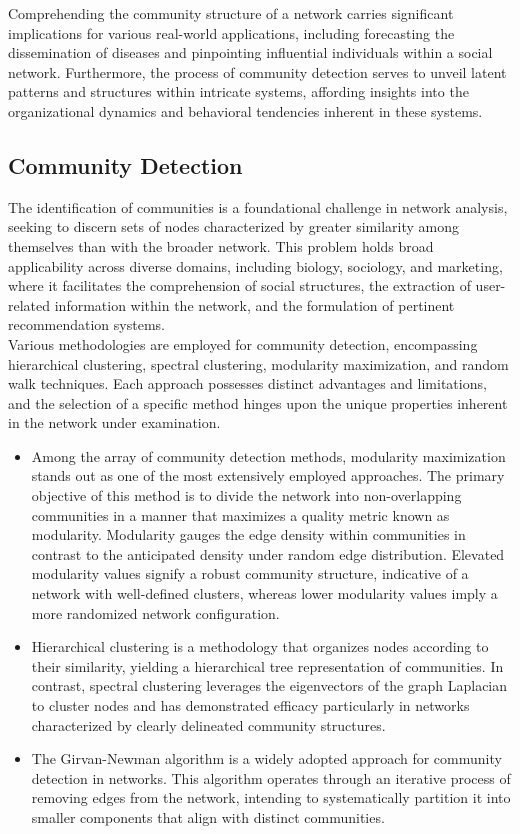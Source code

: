 Comprehending the community structure of a network carries significant implications for various real-world applications, including forecasting the dissemination of diseases and pinpointing influential individuals within a social network. Furthermore, the process of community detection serves to unveil latent patterns and structures within intricate systems, affording insights into the organizational dynamics and behavioral tendencies inherent in these systems.
\subsection{Community Detection}
\indent The identification of communities is a foundational challenge in network analysis, seeking to discern sets of nodes characterized by greater similarity among themselves than with the broader network. This problem holds broad applicability across diverse domains, including biology, sociology, and marketing, where it facilitates the comprehension of social structures, the extraction of user-related information within the network, and the formulation of pertinent recommendation systems.\\
\indent Various methodologies are employed for community detection, encompassing hierarchical clustering, spectral clustering, modularity maximization, and random walk techniques. Each approach possesses distinct advantages and limitations, and the selection of a specific method hinges upon the unique properties inherent in the network under examination.
\begin{itemize}
    \item Among the array of community detection methods, modularity maximization stands out as one of the most extensively employed approaches. The primary objective of this method is to divide the network into non-overlapping communities in a manner that maximizes a quality metric known as modularity. Modularity gauges the edge density within communities in contrast to the anticipated density under random edge distribution. Elevated modularity values signify a robust community structure, indicative of a network with well-defined clusters, whereas lower modularity values imply a more randomized network configuration.
    \item Hierarchical clustering is a methodology that organizes nodes according to their similarity, yielding a hierarchical tree representation of communities. In contrast, spectral clustering leverages the eigenvectors of the graph Laplacian to cluster nodes and has demonstrated efficacy particularly in networks characterized by clearly delineated community structures.
    \item The Girvan-Newman algorithm is a widely adopted approach for community detection in networks. This algorithm operates through an iterative process of removing edges from the network, intending to systematically partition it into smaller components that align with distinct communities.
\end{itemize}

